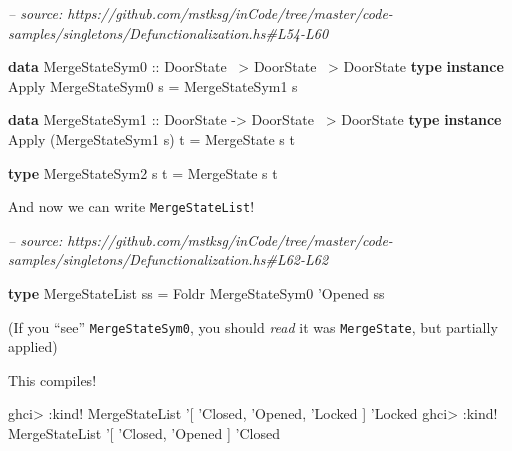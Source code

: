 \documentclass[]{article}
\newenvironment{Shaded}{}{}
\newcommand{\CommentTok}[1]{\textcolor[rgb]{0.38,0.63,0.69}{\textit{#1}}}
\newcommand{\DataTypeTok}[1]{\textcolor[rgb]{0.56,0.13,0.00}{#1}}
\newcommand{\FunctionTok}[1]{\textcolor[rgb]{0.02,0.16,0.49}{#1}}
\newcommand{\KeywordTok}[1]{\textcolor[rgb]{0.00,0.44,0.13}{\textbf{#1}}}
\newcommand{\NormalTok}[1]{#1}
\newcommand{\OtherTok}[1]{\textcolor[rgb]{0.00,0.44,0.13}{#1}}
\begin{document}
\begin{Shaded}
\begin{Highlighting}[]
\CommentTok{-- source: https://github.com/mstksg/inCode/tree/master/code-samples/singletons/Defunctionalization.hs#L54-L60}

\KeywordTok{data} \DataTypeTok{MergeStateSym0}\OtherTok{ ::} \DataTypeTok{DoorState} \FunctionTok{~>} \DataTypeTok{DoorState} \FunctionTok{~>} \DataTypeTok{DoorState}
\KeywordTok{type} \KeywordTok{instance} \DataTypeTok{Apply} \DataTypeTok{MergeStateSym0}\NormalTok{ s }\FunctionTok{=} \DataTypeTok{MergeStateSym1}\NormalTok{ s}

\KeywordTok{data} \DataTypeTok{MergeStateSym1}\OtherTok{ ::} \DataTypeTok{DoorState} \OtherTok{->} \DataTypeTok{DoorState} \FunctionTok{~>} \DataTypeTok{DoorState}
\KeywordTok{type} \KeywordTok{instance} \DataTypeTok{Apply}\NormalTok{ (}\DataTypeTok{MergeStateSym1}\NormalTok{ s) t }\FunctionTok{=} \DataTypeTok{MergeState}\NormalTok{ s t}

\KeywordTok{type} \DataTypeTok{MergeStateSym2}\NormalTok{ s t }\FunctionTok{=} \DataTypeTok{MergeState}\NormalTok{ s t}
\end{Highlighting}
\end{Shaded}

And now we can write \texttt{MergeStateList}!

\begin{Shaded}
\begin{Highlighting}[]
\CommentTok{-- source: https://github.com/mstksg/inCode/tree/master/code-samples/singletons/Defunctionalization.hs#L62-L62}

\KeywordTok{type} \DataTypeTok{MergeStateList}\NormalTok{ ss }\FunctionTok{=} \DataTypeTok{Foldr} \DataTypeTok{MergeStateSym0}\NormalTok{ '}\DataTypeTok{Opened}\NormalTok{ ss}
\end{Highlighting}
\end{Shaded}

(If you ``see'' \texttt{MergeStateSym0}, you should \emph{read} it was
\texttt{MergeState}, but partially applied)

This compiles!

\begin{Shaded}
\begin{Highlighting}[]
\NormalTok{ghci}\FunctionTok{>} \FunctionTok{:}\NormalTok{kind}\FunctionTok{!} \DataTypeTok{MergeStateList}\NormalTok{ '[ '}\DataTypeTok{Closed}\NormalTok{, '}\DataTypeTok{Opened}\NormalTok{, '}\DataTypeTok{Locked}\NormalTok{ ]}
\NormalTok{'}\DataTypeTok{Locked}
\NormalTok{ghci}\FunctionTok{>} \FunctionTok{:}\NormalTok{kind}\FunctionTok{!} \DataTypeTok{MergeStateList}\NormalTok{ '[ '}\DataTypeTok{Closed}\NormalTok{, '}\DataTypeTok{Opened}\NormalTok{ ]}
\NormalTok{'}\DataTypeTok{Closed}
\end{Highlighting}
\end{Shaded}
\end{document}
